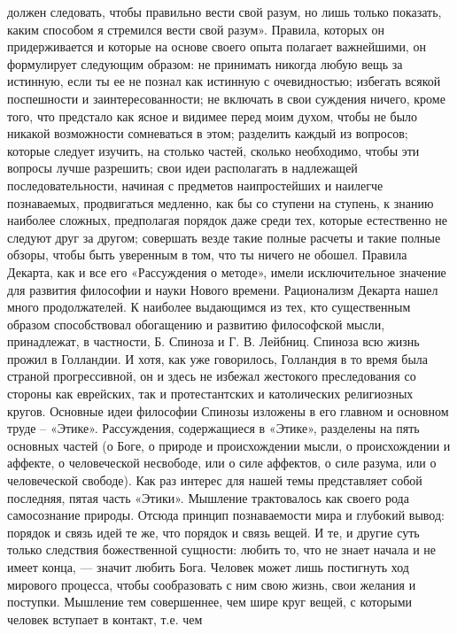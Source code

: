 \documentclass[12pt]{article}
\begin{document}
должен следовать, чтобы правильно вести свой разум, но лишь только показать, каким способом я стремился
вести свой разум».
Правила, которых он придерживается и которые на основе своего опыта полагает важнейшими, он формулирует
следующим образом:
не  принимать  никогда любую  вещь за  истинную, если ты ее не познал как истинную с очевидностью;
избегать всякой поспешности и заинтересованности; не включать в свои суждения ничего, кроме того, что
предстало как ясное и видимее перед моим духом, чтобы не было никакой возможности сомневаться в этом;
разделить каждый из вопросов; которые следует изучить, на столько частей, сколько необходимо, чтобы эти 
вопросы лучше разрешить;
свои идеи располагать в надлежащей последовательности,    начиная    с    предметов    наипростейших и
наилегче познаваемых, продвигаться медленно, как бы со ступени на ступень, к знанию наиболее
сложных, предполагая порядок даже среди тех, которые естественно не следуют друг за другом;
совершать везде такие полные расчеты и такие полные обзоры, чтобы быть уверенным в том, что ты ничего не
обошел.
Правила  Декарта,  как  и  все  его  «Рассуждения  о  методе»,  имели  исключительное  значение  для  развития
философии и науки Нового времени.
Рационализм Декарта нашел много продолжателей. К наиболее выдающимся из тех, кто существенным образом
способствовал обогащению и развитию философской мысли, принадлежат, в частности, Б. Спиноза и Г. В.
Лейбниц.
Спиноза всю жизнь прожил в Голландии. И хотя, как уже говорилось, Голландия в то время была страной
прогрессивной,  он  и  здесь  не  избежал  жестокого  преследования  со  стороны  как  еврейских,  так  и
протестантских и католических религиозных кругов.
Основные  идеи  философии  Спинозы  изложены  в  его  главном  и  основном  труде  –  «Этике».  Рассуждения,
содержащиеся в «Этике», разделены на пять основных частей (о Боге, о природе и происхождении мысли, о
происхождении  и  аффекте,  о  человеческой   несвободе,   или   о   силе   аффектов,  о  силе  разума,  или  о
человеческой свободе). Как раз интерес для нашей темы представляет собой последняя, пятая часть «Этики».
Мышление  трактовалось  как  своего  рода  самосознание  природы.  Отсюда  принцип  познаваемости  мира  и
глубокий вывод: порядок и связь идей те же, что порядок и связь вещей. И те, и другие суть только следствия
божественной сущности: любить то, что не знает начала и не имеет конца, — значит любить Бога. Человек
может  лишь  постигнуть  ход  мирового  процесса,  чтобы  сообразовать  с  ним  свою  жизнь,  свои  желания  и
поступки. Мышление тем совершеннее, чем шире круг вещей, с которыми человек вступает в контакт, т.е. чем
\end{document}
